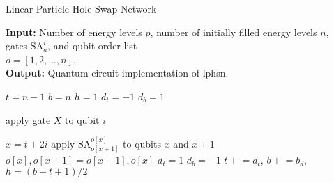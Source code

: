 \documentclass[Dual]{msu-thesis}
\begin{document}
\begin{algorithm}[H]

\caption{Linear Particle-Hole Swap Network}\label{lphsn}

\hspace*{\algorithmicindent} \textbf{Input:} Number of energy levels $p$, number of initially  filled energy levels $n$,
\\
\hspace*{\algorithmicindent} gates $\text{SA}^i_a$, and qubit order list
\\
\hspace*{\algorithmicindent} $o=[1,2,...,n]$.
\\
\hspace*{\algorithmicindent} \textbf{Output:} Quantum circuit implementation of lphsn.

\begin{algorithmic}[H]

\State $t = n - 1$ 
\State $b = n$ 
\State $h = 1$ 
\State $d_t = -1$ 
\State $d_b = 1$ 

    \State apply gate $X$ to qubit $i$
\EndFor

        \State $x=t+2i$
        \State apply $\text{SA}^{o[x]}_{o[x+1]}$ to qubits $x$ and $x+1$
        \State $o[x], o[x+1] = o[x+1], o[x]$
    \EndFor
        \State $d_t = 1$
    \EndIf
        \State $d_b = -1$
    \EndIf
    \State $t\mathrel{+}=d_t$, $b\mathrel{+}=b_d$, $h = (b-t+1)/2$
\EndWhile
\end{algorithmic}

\end{algorithm}
\end{document}
